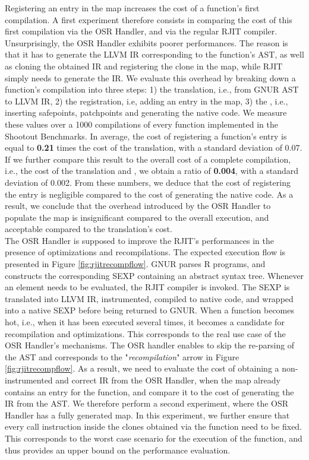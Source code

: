 Registering an entry in the  map increases the cost of a function's first compilation.
A first experiment therefore consists in comparing the cost of this first compilation via the OSR Handler, and via the regular RJIT compiler. 
Unsurprisingly, the OSR Handler exhibits poorer performances. 
The reason is that it has to generate the LLVM IR corresponding to the function's AST, as well as cloning the obtained IR and registering the clone in the  map, while RJIT simply needs to generate the IR.
We evaluate this overhead by breaking down a function's compilation into three steps: 1) the translation, i.e., from GNUR AST to LLVM IR, 2) the registration, i.e, adding an entry in the  map, 3) the , i.e., inserting safepoints, patchpoints and generating the native code.
We measure these values over a 1000 compilations of every function implemented in the Shootout Benchmarks.
In average, the cost of registering a function's entry is equal to \textbf{0.21} times the cost of the translation, with a standard deviation of 0.07.
If we further compare this result to the overall cost of a complete compilation, i.e., the cost of the translation and , we obtain a ratio of \textbf{0.004}, with a standard deviation of 0.002. 
From these numbers, we deduce that the cost of registering the entry is negligible compared to the cost of generating the native code.   
As a result, we conclude that the overhead introduced by the OSR Handler to populate the  map is insignificant compared to the overall execution, and acceptable compared to the translation's cost.\\


The OSR Handler is supposed to improve the RJIT's performances in the presence of optimizations and recompilations.
The expected execution flow is presented in Figure \ref{fig:rjitrecompflow}.
GNUR parses R programs, and constructs the corresponding SEXP containing an abstract syntax tree.
Whenever an element needs to be evaluated, the RJIT compiler is invoked. 
The SEXP is translated into LLVM IR, instrumented, compiled to native code, and wrapped into a native SEXP before being returned to GNUR.
When a function becomes hot, i.e., when it has been executed several times, it becomes a candidate for recompilation and optimizations.
This corresponds to the real use case of the OSR Handler's mechanisms.
The OSR handler enables to skip the re-parsing of the AST and corresponds to the "\textit{recompilation}" arrow in Figure \ref{fig:rjitrecompflow}.
As a result, we need to evaluate the cost of obtaining a non-instrumented and correct IR from the OSR Handler, when the  map already contains an entry for the function, and compare it to the cost of generating the IR from the AST.
We therefore perform a second experiment, where the OSR Handler has a fully generated  map.
In this experiment, we further ensure that every call instruction inside the clones obtained via the  function need to be fixed.
This corresponds to the worst case scenario for the execution of the  function, and thus provides an upper bound on the performance evaluation.\\

